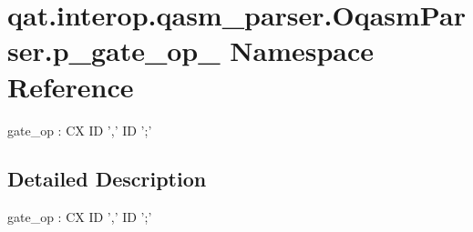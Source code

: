 \hypertarget{namespaceqat_1_1interop_1_1qasm__parser_1_1OqasmParser_1_1p__gate__op__1}{\section{qat.\-interop.\-qasm\-\_\-parser.\-Oqasm\-Parser.\-p\-\_\-gate\-\_\-op\-\_ Namespace Reference}
\label{namespaceqat_1_1interop_1_1qasm__parser_1_1OqasmParser_1_1p__gate__op__1}
}


gate\-\_\-op \-: C\-X I\-D ',' I\-D ';'  




\subsection{Detailed Description}
gate\-\_\-op \-: C\-X I\-D ',' I\-D ';' 
